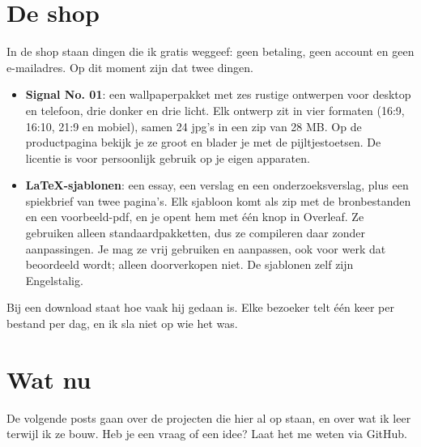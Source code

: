 \documentclass[11pt,a4paper]{article}
\begin{document}
\section{De shop}

In de shop staan dingen die ik gratis weggeef: geen betaling, geen account en geen e-mailadres. Op dit moment zijn dat twee dingen.

\begin{itemize}
  \item \textbf{Signal No. 01}: een wallpaperpakket met zes rustige ontwerpen voor desktop en telefoon, drie donker en drie licht. Elk ontwerp zit in vier formaten (16:9, 16:10, 21:9 en mobiel), samen 24 jpg's in een zip van 28 MB. Op de productpagina bekijk je ze groot en blader je met de pijltjestoetsen. De licentie is voor persoonlijk gebruik op je eigen apparaten.
  \item \textbf{LaTeX-sjablonen}: een essay, een verslag en een onderzoeksverslag, plus een spiekbrief van twee pagina's. Elk sjabloon komt als zip met de bronbestanden en een voorbeeld-pdf, en je opent hem met één knop in Overleaf. Ze gebruiken alleen standaardpakketten, dus ze compileren daar zonder aanpassingen. Je mag ze vrij gebruiken en aanpassen, ook voor werk dat beoordeeld wordt; alleen doorverkopen niet. De sjablonen zelf zijn Engelstalig.
\end{itemize}

\begin{note}
Bij een download staat hoe vaak hij gedaan is. Elke bezoeker telt één keer per bestand per dag, en ik sla niet op wie het was.
\end{note}

\section{Wat nu}

De volgende posts gaan over de projecten die hier al op staan, en over wat ik leer terwijl ik ze bouw. Heb je een vraag of een idee? Laat het me weten via GitHub.
\end{document}
